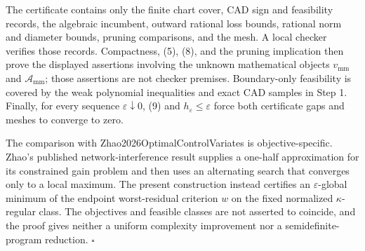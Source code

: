 The certificate contains only the finite chart cover, CAD sign and feasibility records, the algebraic incumbent, outward rational loss bounds, rational norm and diameter bounds, pruning comparisons, and the mesh.  A local checker verifies those records.  Compactness, (5), (8), and the pruning implication then prove the displayed assertions involving the unknown mathematical objects \(v_{\mathrm{mm}}\) and \(\mathcal A_{\mathrm{mm}}\); those assertions are not checker premises.  Boundary-only feasibility is covered by the weak polynomial inequalities and exact CAD samples in Step 1.  Finally, for every sequence \(\varepsilon\downarrow0\), (9) and \(h_\varepsilon\le\varepsilon\) force both certificate gaps and meshes to converge to zero.

The comparison with Zhao2026OptimalControlVariates is objective-specific.  Zhao's published network-interference result supplies a one-half approximation for its constrained gain problem and then uses an alternating search that converges only to a local maximum.  The present construction instead certifies an \(\varepsilon\)-global minimum of the endpoint worst-residual criterion \(w\) on the fixed normalized \(\kappa\)-regular class.  The objectives and feasible classes are not asserted to coincide, and the proof gives neither a uniform complexity improvement nor a semidefinite-program reduction. \(\square\)